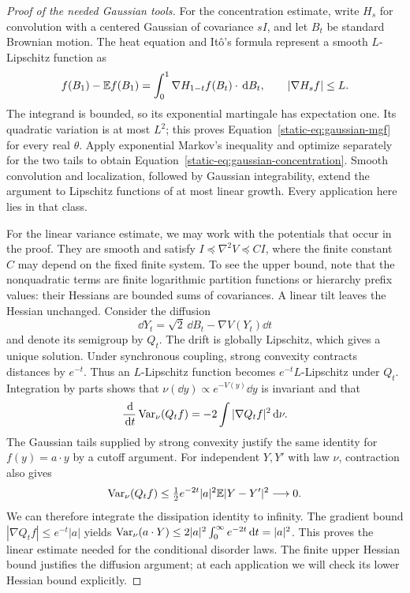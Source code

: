 \begin{proof}[Proof of the needed Gaussian tools]
For the concentration estimate, write $H_s$ for convolution with a
centered Gaussian of covariance $sI$, and let $B_t$ be standard Brownian
motion. The heat equation and It\^o's formula represent a smooth
$L$-Lipschitz function as
\[
 f(B_1)-\mathbb E f(B_1)
 =\int_0^1\nabla H_{1-t}f(B_t)\cdot\,\mathrm d B_t,
 \qquad |\nabla H_s f|\le L.
\]
The integrand is bounded, so its exponential martingale has expectation
one. Its quadratic variation is at most $L^2$; this proves
Equation~\eqref{static-eq:gaussian-mgf} for every real $\theta$.
Apply exponential Markov's inequality and optimize separately for the
two tails to obtain Equation~\eqref{static-eq:gaussian-concentration}.
Smooth convolution and localization, followed by Gaussian
integrability, extend the argument to Lipschitz functions of at most
linear growth. Every application here lies in that class.

For the linear variance estimate, we may work with the potentials that
occur in the proof. They are smooth and satisfy
$I\preceq\nabla^2V\preceq CI$, where the finite constant $C$ may depend
on the fixed finite system. To see the upper bound, note that the
nonquadratic terms are finite logarithmic partition functions or
hierarchy prefix values: their Hessians are bounded sums of
covariances. A linear tilt leaves the Hessian unchanged. Consider the
diffusion
\[
 \dd Y_t=\sqrt2\,\dd B_t-\nabla V(Y_t)\dd t
\]
and denote its semigroup by $Q_t$. The drift is globally Lipschitz,
which gives a unique solution. Under synchronous coupling, strong
convexity contracts distances by $e^{-t}$. Thus an $L$-Lipschitz
function becomes $e^{-t}L$-Lipschitz under $Q_t$. Integration by parts
shows that $\nu(\dd y)\propto e^{-V(y)}\dd y$ is invariant and that
\[
 \frac{\,\mathrm d}{\,\mathrm d t}\operatorname{Var}_\nu(Q_tf)
 =-2\int|\nabla Q_tf|^2\,\mathrm d\nu.
\]
The Gaussian tails supplied by strong convexity justify the same
identity for $f(y)=a\cdot y$ by a cutoff argument. For independent
$Y,Y'$ with law $\nu$, contraction also gives
\[
 \operatorname{Var}_\nu(Q_tf)
 \le\tfrac12 e^{-2t}|a|^2\mathbb E|Y-Y'|^2\longrightarrow0.
\]
We can therefore integrate the dissipation identity to infinity.
The gradient bound $|\nabla Q_tf|\le e^{-t}|a|$ yields
$\operatorname{Var}_\nu(a\cdot Y)\le2|a|^2\int_0^\infty e^{-2t}\,\mathrm d t=|a|^2$.
This proves the linear estimate needed for the conditional disorder
laws. The finite upper Hessian bound justifies the diffusion argument;
at each application we will check its lower Hessian bound explicitly.
\end{proof}


